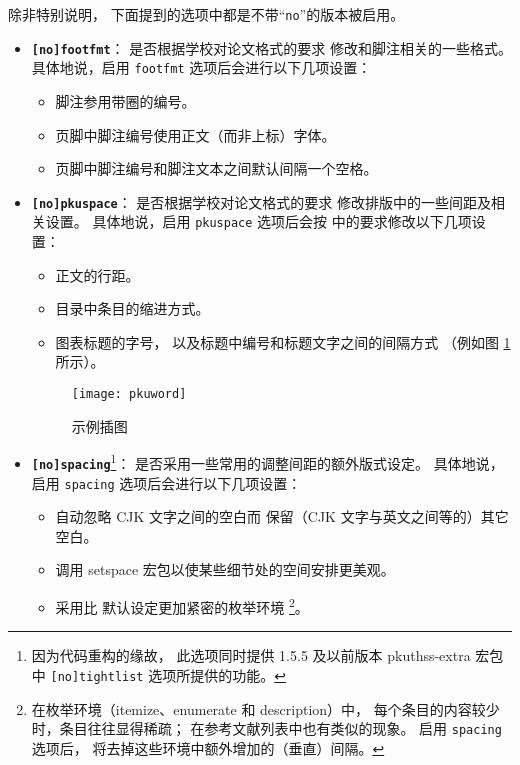 除非特别说明，
下面提到的选项中都是不带“\verb|no|”的版本被启用。

\begin{itemize}
	\item \textbf{\texttt{[no]footfmt}}：
		是否根据学校对论文格式的要求\mbox{\supercite{pku-thesisstyle}}%
		修改和脚注相关的一些格式。
		具体地说，启用 \verb|footfmt| 选项后会进行以下几项设置：
	\begin{itemize}
		\item 脚注参用带圈的编号。
		\item 页脚中脚注编号使用正文（而非上标）字体。
		\item 页脚中脚注编号和脚注文本之间默认间隔一个空格。
	\end{itemize}

	\item \textbf{\texttt{[no]pkuspace}}：
		是否根据学校对论文格式的要求\mbox{\supercite{pku-thesisstyle}}%
		修改排版中的一些间距及相关设置。
		具体地说，启用 \verb|pkuspace| 选项后会按
		\parencite{pku-thesisstyle} 中的要求修改以下几项设置：
	\begin{itemize}
		\item 正文的行距。
		\item 目录中条目的缩进方式。
		\item 图表标题的字号，
			以及标题中编号和标题文字之间的间隔方式
			（例如图 \ref{fig:example} 所示）。
	\end{itemize}

	\begin{figure}[htbp!]
		\centering
		\texttt{[image: pkuword]}
		\caption{示例插图}\label{fig:example}
	\end{figure}

	\item \textbf{\texttt{[no]spacing}}\footnote{%
			因为代码重构的缘故，
			此选项同时提供 1.5.5 及以前版本 pkuthss-extra 宏包
			中 \texttt{[no]tightlist} 选项所提供的功能。%
		}：
		是否采用一些常用的调整间距的额外版式设定。
		具体地说，启用 \verb|spacing| 选项后会进行以下几项设置：
	\begin{itemize}
		\item 自动忽略 CJK 文字之间的空白而
			保留（CJK 文字与英文之间等的）其它空白。
		\item 调用 setspace 宏包以使某些细节处的空间安排更美观。
		\item 采用比  默认设定更加紧密的枚举环境%
			\footnote{%
				在枚举环境（itemize、enumerate 和 description）中，
				每个条目的内容较少时，条目往往显得稀疏；
				在参考文献列表中也有类似的现象。
				启用 \texttt{spacing} 选项后，
				将去掉这些环境中额外增加的（垂直）间隔。%
			}。
	\end{itemize}


\end{itemize}
